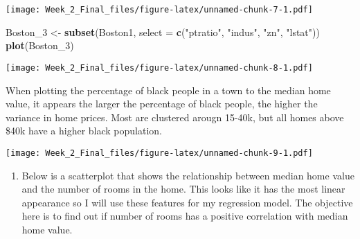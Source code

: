 \documentclass[]{article}
\newenvironment{Shaded}{\begin{snugshade}}{\end{snugshade}}
\newcommand{\KeywordTok}[1]{\textcolor[rgb]{0.13,0.29,0.53}{\textbf{#1}}}
\newcommand{\DataTypeTok}[1]{\textcolor[rgb]{0.13,0.29,0.53}{#1}}
\newcommand{\DecValTok}[1]{\textcolor[rgb]{0.00,0.00,0.81}{#1}}
\newcommand{\StringTok}[1]{\textcolor[rgb]{0.31,0.60,0.02}{#1}}
\newcommand{\OperatorTok}[1]{\textcolor[rgb]{0.81,0.36,0.00}{\textbf{#1}}}
\newcommand{\NormalTok}[1]{#1}
\providecommand{\tightlist}{%
  \setlength{\itemsep}{0pt}\setlength{\parskip}{0pt}}
\begin{document}
\texttt{[image: Week\_2\_Final\_files/figure-latex/unnamed-chunk-7-1.pdf]}

\begin{Shaded}
\begin{Highlighting}[]
\NormalTok{Boston_}\DecValTok{3}\NormalTok{ <-}\StringTok{ }\KeywordTok{subset}\NormalTok{(Boston1, }\DataTypeTok{select =} \KeywordTok{c}\NormalTok{(}\StringTok{"ptratio"}\NormalTok{, }\StringTok{"indus"}\NormalTok{, }\StringTok{"zn"}\NormalTok{, }\StringTok{"lstat"}\NormalTok{))}
\KeywordTok{plot}\NormalTok{(Boston_}\DecValTok{3}\NormalTok{)}
\end{Highlighting}
\end{Shaded}

\texttt{[image: Week\_2\_Final\_files/figure-latex/unnamed-chunk-8-1.pdf]}

When plotting the percentage of black people in a town to the median
home value, it appears the larger the percentage of black people, the
higher the variance in home prices. Most are clustered arougn 15-40k,
but all homes above \$40k have a higher black population.

\begin{Shaded}
\end{Shaded}

\texttt{[image: Week\_2\_Final\_files/figure-latex/unnamed-chunk-9-1.pdf]}

\begin{enumerate}
\def\labelenumi{\arabic{enumi})}
\setcounter{enumi}{3}
\tightlist
\item
  Below is a scatterplot that shows the relationship between median home
  value and the number of rooms in the home. This looks like it has the
  most linear appearance so I will use these features for my regression
  model. The objective here is to find out if number of rooms has a
  positive correlation with median home value.
\end{enumerate}

\begin{Shaded}
\end{Shaded}
\end{document}
